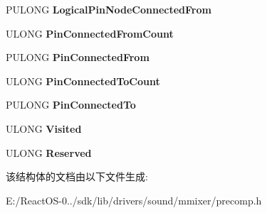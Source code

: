 \begin{DoxyCompactItemize}
\item 
\mbox{\label{struct_____t_o_p_o_l_o_g_y___n_o_d_e_____ab36ed005d63b9befa36cb98677c9156f}} 
P\+U\+L\+O\+NG {\bfseries Logical\+Pin\+Node\+Connected\+From}
\item 
\mbox{\label{struct_____t_o_p_o_l_o_g_y___n_o_d_e_____a281ab2d76c6cc1482dbe069e7746be7b}} 
U\+L\+O\+NG {\bfseries Pin\+Connected\+From\+Count}
\item 
\mbox{\label{struct_____t_o_p_o_l_o_g_y___n_o_d_e_____a26de54b0e5eb05790f6adf7ad1ece30b}} 
P\+U\+L\+O\+NG {\bfseries Pin\+Connected\+From}
\item 
\mbox{\label{struct_____t_o_p_o_l_o_g_y___n_o_d_e_____ac19eafda0dc257bffa030a057bfacc30}} 
U\+L\+O\+NG {\bfseries Pin\+Connected\+To\+Count}
\item 
\mbox{\label{struct_____t_o_p_o_l_o_g_y___n_o_d_e_____ae8bc29f43636c00a45716f58b4cce172}} 
P\+U\+L\+O\+NG {\bfseries Pin\+Connected\+To}
\item 
\mbox{\label{struct_____t_o_p_o_l_o_g_y___n_o_d_e_____ac0e9ab684b5222dc1cd7249382b24ef8}} 
U\+L\+O\+NG {\bfseries Visited}
\item 
\mbox{\label{struct_____t_o_p_o_l_o_g_y___n_o_d_e_____a68f9faad09b2f868c265254a787a0caa}} 
U\+L\+O\+NG {\bfseries Reserved}
\end{DoxyCompactItemize}


该结构体的文档由以下文件生成\+:\begin{DoxyCompactItemize}
\item 
E\+:/\+React\+O\+S-\/0../sdk/lib/drivers/sound/mmixer/precomp.\+h\end{DoxyCompactItemize}
